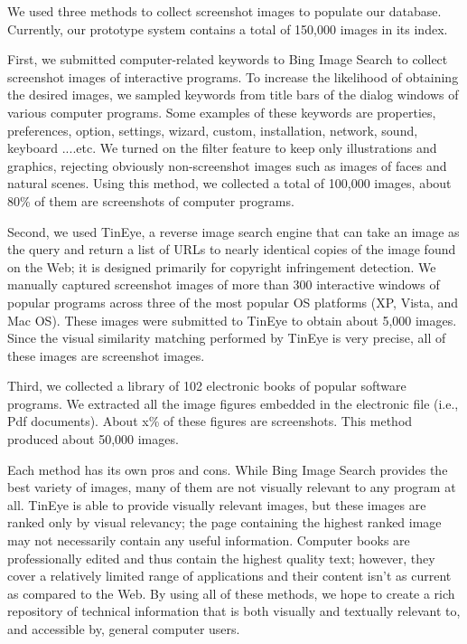\documentclass{www2010-submission}
\begin{document}

We used three methods to collect screenshot images to populate our
database. Currently, our prototype system contains a total of
150,000 images in its index.

First, we submitted computer-related keywords to Bing Image Search
to collect screenshot images of interactive programs. To increase
the likelihood of obtaining the desired images, we sampled
keywords from title bars of the dialog windows of various computer
programs. Some examples of these keywords are properties,
preferences, option, settings, wizard, custom, installation,
network, sound, keyboard ....etc. We turned on the filter feature
to keep only illustrations and graphics, rejecting obviously
non-screenshot images such as images of faces and natural scenes.
Using this method, we collected a total of 100,000 images, about
80\% of them are screenshots of computer programs.

Second, we used TinEye, a reverse image search engine that can
take an image as the query and return a list of URLs to nearly
identical copies of the image found on the Web; it is designed primarily for copyright
infringement detection. We manually captured screenshot images of more than
300 interactive windows of popular programs across three of the
most popular OS platforms (XP, Vista, and Mac OS). These images
were submitted to TinEye to obtain about 5,000 images. Since the
visual similarity matching performed by TinEye is very precise,
all of these images are screenshot images.

Third, we collected a library of 102 electronic books of popular
software programs. We extracted all the image figures embedded in
the electronic file (i.e., Pdf documents). About x\% of these
figures are screenshots. This method produced about 50,000 images.

Each method has its own pros and cons. While Bing Image Search
provides the best variety of images, many of them are not visually
relevant to any program at all. TinEye is able to provide visually
relevant images, but these images are ranked only by visual
relevancy; the page containing the highest ranked image may not
necessarily contain any useful information. Computer books are
professionally edited and thus contain the highest quality
text; however, they cover a relatively limited range of applications
and their content isn't as current as compared to the Web. By
using all of these methods, we hope to create a rich repository of
technical information that is both visually and textually relevant
to, and accessible by, general computer users.
 
\end{document}

